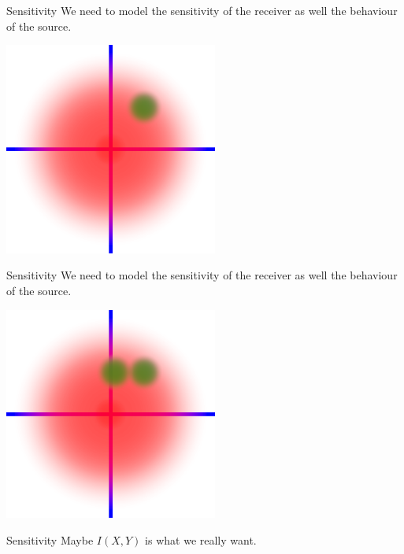 \documentclass{beamer}
\newcommand{\crish}{\color{reddish}}
\newcommand{\cbla}{\color{black}}
\begin{document}
\begin{frame}{Sensitivity}
 We need to model the sensitivity of the receiver as well the
 behaviour of the source.
  \begin{center}
\includegraphics[width=7cm]{cont3.png}
  \end{center}  
\end{frame}


\begin{frame}{Sensitivity}
 We need to model the sensitivity of the receiver as well the
 behaviour of the source.
  \begin{center}
\includegraphics[width=7cm]{cont4.png}
  \end{center}  
\end{frame}


\begin{frame}{Sensitivity}
Maybe \crish$I(X,Y)$\cbla{} is what we really want.
\end{frame}
\end{document}
